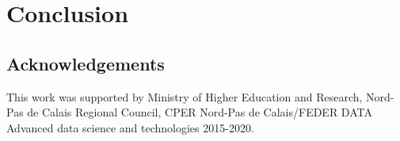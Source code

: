 \documentclass[conference]{IEEEtran}
\begin{document}



\section{Conclusion}
\label{sec:conclusion}


 

\subsection*{Acknowledgements} 
This work was supported by Ministry of Higher Education and Research, Nord-Pas de Calais Regional Council, CPER Nord-Pas de Calais/FEDER DATA Advanced data science and technologies 2015-2020.


% 
\end{document}
